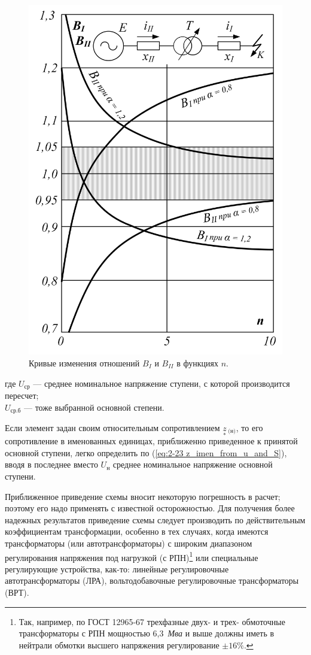 \begin{figure} %
	\centering
	\includegraphics[width=0.95\linewidth]{pic/2-2}
	\caption{Кривые изменения отношений $ B_I $ и $ B_{II} $ в функциях $ n $.}
	\label{fig:2-2 B_I and B_I}
\end{figure}

где $ U_{\text{ср}} $ --- среднее номинальное напряжение ступени, с которой производится пересчет;\\
$ U_{\text{ср.б}} $ --- тоже выбранной основной степени.

Если элемент задан своим относительным сопротивлением $ \underset{*}{z}\!\,_{\text{(н)}} $, то его сопротивление в именованных единицах, приближенно приведенное к принятой основной ступени, легко определить по (\ref{eq:2-23 z_imen_from_u_and_S}), вводя в последнее вместо $ U_{\text{н}} $ среднее номинальное напряжение основной ступени.

Приближенное приведение схемы вносит некоторую погрешность в расчет; поэтому его надо применять с известной осторожностью. Для получения более надежных результатов приведение схемы следует производить по действительным коэффициентам трансформации, особенно в тех случаях, когда имеются трансформаторы (или автотрансформаторы) с широким диапазоном регулирования напряжения под нагрузкой (с РПН)\footnote{Так, например, по ГОСТ 12965-67 трехфазные двух- и трех- обмоточные трансформаторы с РПН мощностью 6,3~\textit{Мва} и выше должны иметь в нейтрали обмотки высшего напряжения регулирование $ \pm16\% $.} или специальные регулирующие устройства, как-то: линейные регулировочные автотрансформаторы (ЛРА), вольтодобавочные регулировочные трансформаторы (ВРТ).

